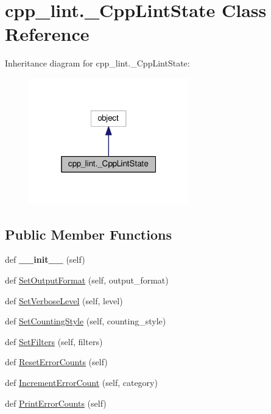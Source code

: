 \hypertarget{classcpp__lint_1_1___cpp_lint_state}{}\section{cpp\+\_\+lint.\+\_\+\+Cpp\+Lint\+State Class Reference}
\label{classcpp__lint_1_1___cpp_lint_state}


Inheritance diagram for cpp\+\_\+lint.\+\_\+\+Cpp\+Lint\+State\+:
\nopagebreak
\begin{figure}[H]
\begin{center}
\leavevmode
\includegraphics[width=196pt]{classcpp__lint_1_1___cpp_lint_state__inherit__graph}
\end{center}
\end{figure}
\subsection*{Public Member Functions}
\begin{DoxyCompactItemize}
\item 
\mbox{\label{classcpp__lint_1_1___cpp_lint_state_aaa746f5aa29c2ad2b7000c9f72c89510}} 
def {\bfseries \+\_\+\+\_\+init\+\_\+\+\_\+} (self)
\item 
def \mbox{\hyperlink{classcpp__lint_1_1___cpp_lint_state_a3c1ab0f552461fa7de6640fb98bdb4dc}{Set\+Output\+Format}} (self, output\+\_\+format)
\item 
def \mbox{\hyperlink{classcpp__lint_1_1___cpp_lint_state_a5f1481dfe5f79dd0927a213ab44d75f7}{Set\+Verbose\+Level}} (self, level)
\item 
def \mbox{\hyperlink{classcpp__lint_1_1___cpp_lint_state_a88bf958eb7219488fffd52ebfd57f4f1}{Set\+Counting\+Style}} (self, counting\+\_\+style)
\item 
def \mbox{\hyperlink{classcpp__lint_1_1___cpp_lint_state_a5b8ca5eb2124431e70a0b374842fafaf}{Set\+Filters}} (self, filters)
\item 
def \mbox{\hyperlink{classcpp__lint_1_1___cpp_lint_state_aaa00731337c82f65dbb354e23ed74fcd}{Reset\+Error\+Counts}} (self)
\item 
def \mbox{\hyperlink{classcpp__lint_1_1___cpp_lint_state_a639dac461e7354dcec4b629195758852}{Increment\+Error\+Count}} (self, category)
\item 
def \mbox{\hyperlink{classcpp__lint_1_1___cpp_lint_state_af4769688903eac9e7cd6de51cd1de8bf}{Print\+Error\+Counts}} (self)
\end{DoxyCompactItemize}
